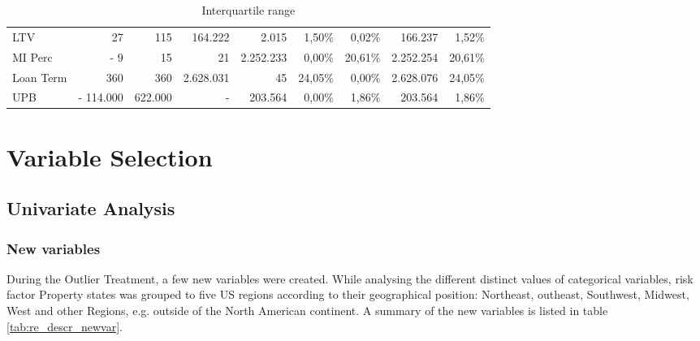 \begin{landscape}
\begin{table}[]
{\begin{tabular}{lrrrrrrrr}
LTV               & 27                                             & 115                                        & 164.222                                             & 2.015                                               & 1,50\%                                              & 0,02\%                                              & 166.237                                  & 1,52\%                                   \\
MI Perc           & -                                            9 & 15                                         & 21                                                  & 2.252.233                                           & 0,00\%                                              & 20,61\%                                             & 2.252.254                                & 20,61\%                                  \\
Loan Term         & 360                                            & 360                                        & 2.628.031                                           & 45                                                  & 24,05\%                                             & 0,00\%                                              & 2.628.076                                & 24,05\%                                  \\
UPB               & -                           114.000            & 622.000                                    & -                                                   & 203.564                                             & 0,00\%                                              & 1,86\%                                              & 203.564                                  & 1,86\%  \\\bottomrule                                
\end{tabular}%
}
\caption{Interquartile range}
\label{tab:re_iqr}
\end{table}

\end{landscape}

\section{Variable Selection}
\subsection{Univariate Analysis}

\subsubsection{New variables}
During the Outlier Treatment, a few new variables were created. While analysing the different distinct values of categorical variables, risk factor Property states was grouped to five US regions according to their geographical position: Northeast,  outheast, Southwest, Midwest, West and other Regions, e.g. outside of the North American  continent. A summary of the new variables is listed in table \ref{tab:re_descr_newvar}.

